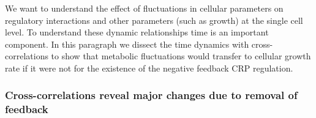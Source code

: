 We want to understand the effect of fluctuations in cellular parameters on regulatory interactions and other parameters (such as growth) at the single cell level.
%
To understand these dynamic relationships time is an important component.
%
%
In this paragraph we dissect the time dynamics with cross-correlations
to show that metabolic fluctuations would transfer to cellular growth rate if it were not for the existence of the negative feedback CRP regulation.

\subsubsection{Cross-correlations reveal major changes due to removal of feedback}

